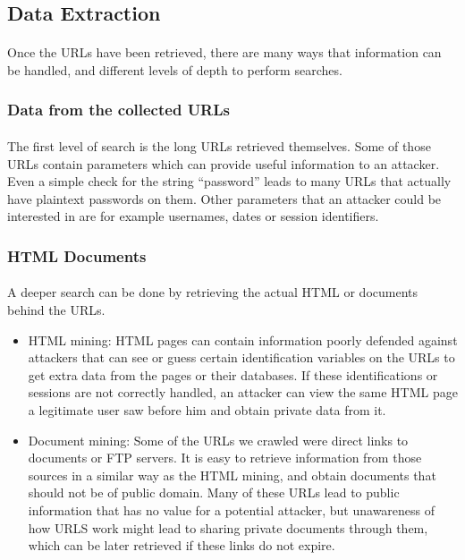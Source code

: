 \documentclass[12pt]{article}
\begin{document}
\subsection{Data Extraction}

\paragraph{}
Once the URLs have been retrieved, there are many ways that information can be handled, and different levels of depth to perform searches.

\subsubsection{Data from the collected URLs}

\paragraph{}
The first level of search is the long URLs retrieved themselves. Some of those URLs contain parameters which can provide useful information to an attacker. Even a simple check for the string “password” leads to many URLs that actually have plaintext passwords on them. Other parameters that an attacker could be interested in are for example usernames, dates or session identifiers.

\subsubsection{HTML Documents}

\paragraph{}
A deeper search can be done by retrieving the actual HTML or documents behind the URLs.

\begin{itemize}

\item  HTML mining: HTML pages can contain information poorly defended against attackers that can see or guess certain identification variables on the URLs to get extra data from the pages or their databases. If these identifications or sessions are not correctly handled, an attacker can view the same HTML page a legitimate user saw before him and obtain private data from it.

\item  Document mining: Some of the URLs we crawled were direct links to documents or FTP servers. It is easy to retrieve information from those sources in a similar way as the HTML mining, and obtain documents that should not be of public domain. Many of these URLs lead to public information that has no value for a potential attacker, but unawareness of how URLS work might lead to sharing private documents through them, which can be later retrieved if these links do not expire.

\end{itemize}
\end{document}
